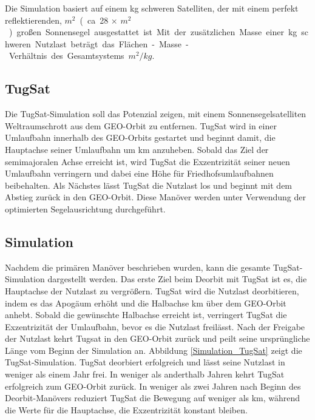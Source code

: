 Die Simulation basiert auf einem \unit[50]{kg} schweren Satelliten, der mit einem perfekt reflektierenden, \unit[800]{$m^2$} (ca. 28 $\times$ \unit[28]{$m^2$} ) großen Sonnensegel ausgestattet ist. Mit der zusätzlichen Masse einer \unit[1000]{kg} schweren Nutzlast beträgt das Flächen-Masse-Verhältnis des Gesamtsystems \unit[0,76]{$m^2 / kg$}.

\subsection{TugSat}
Die TugSat-Simulation soll das Potenzial zeigen, mit einem Sonnensegelsatelliten Weltraumschrott aus dem GEO-Orbit zu entfernen. TugSat wird in einer  Umlaufbahn innerhalb des GEO-Orbits gestartet und beginnt damit, die Hauptachse seiner Umlaufbahn um \unit[350]{km} anzuheben. Sobald das Ziel der semimajoralen Achse erreicht ist, wird TugSat die Exzentrizität seiner neuen Umlaufbahn verringern und dabei eine Höhe für Friedhofsumlaufbahnen beibehalten. Als Nächstes lässt TugSat die Nutzlast los und beginnt mit dem Abstieg zurück in den GEO-Orbit.
Diese Manöver werden unter Verwendung der optimierten Segelausrichtung durchgeführt.
\subsection{Simulation}
Nachdem die primären Manöver beschrieben wurden, kann die gesamte TugSat-Simulation dargestellt werden. 
Das erste Ziel beim Deorbit mit TugSat ist es, die Hauptachse der Nutzlast zu vergrößern. TugSat wird die Nutzlast deorbitieren, indem es das Apogäum erhöht und die Halbachse \unit[350]{km} über dem GEO-Orbit anhebt. Sobald die gewünschte Halbachse erreicht ist, verringert TugSat die Exzentrizität der Umlaufbahn, bevor es die Nutzlast freilässt. Nach der Freigabe der Nutzlast kehrt Tugsat in den GEO-Orbit zurück und peilt seine ursprüngliche Länge vom Beginn der Simulation an. Abbildung \ref{Simulation_TugSat} zeigt die TugSat-Simulation. TugSat deorbiert erfolgreich und lässt seine Nutzlast in weniger als einem Jahr frei. In weniger als anderthalb Jahren kehrt TugSat erfolgreich zum GEO-Orbit zurück. In weniger als zwei Jahren nach Beginn des Deorbit-Manövers reduziert TugSat die Bewegung auf weniger als \unit[5]{km}, während die Werte für die Hauptachse, die Exzentrizität konstant bleiben.

